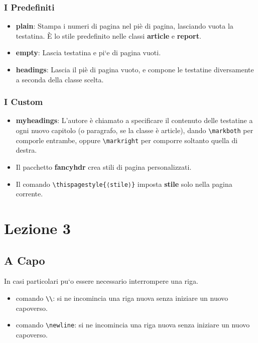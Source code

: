 \documentclass{article}
\begin{document}
            \subsection{I Predefiniti}
                \begin{itemize}
                    \item \textbf{plain}: Stampa i numeri di pagina nel piè di pagina, lasciando vuota la testatina. È lo stile predefinito nelle classi \textbf{article} e \textbf{report}.
                    \item \textbf{empty}: Lascia testatina e pi`e di pagina vuoti.
                    \item \textbf{headings}: Lascia il piè di pagina vuoto, e compone le testatine diversamente a seconda della classe scelta.
                \end{itemize}

            \subsection{I Custom}
                \begin{itemize}
                    \item \textbf{myheadings}: L'autore è chiamato a specificare il contenuto delle testatine a ogni nuovo capitolo (o paragrafo, se la classe è article), dando \verb!\markboth! per comporle entrambe, oppure \verb!\markright! per comporre soltanto quella di destra.
                    \item Il pacchetto \textbf{fancyhdr} crea stili di pagina personalizzati.
                    \item Il comando \verb!\thispagestyle{⟨stile⟩}! imposta \textbf{stile} solo nella pagina corrente.
                \end{itemize}


    \chapter{Lezione 3}

        \section{A Capo}
            In casi particolari pu`o essere necessario interrompere una riga.

            \begin{itemize}
                \item comando \verb!\\!: si ne incomincia una riga nuova senza iniziare un nuovo capoverso.
                \item comando \verb!\newline!: si ne incomincia una riga nuova senza iniziare un nuovo capoverso.
            \end{itemize}
\end{document}
